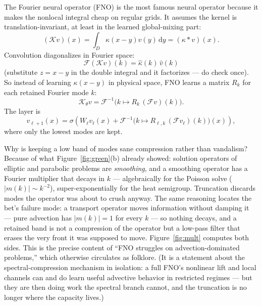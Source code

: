 \documentclass[10pt,a4paper]{article}
\newcommand{\dd}{\mathrm{d}}
\newcommand{\K}{\mathcal{K}}
\newcommand{\F}{\mathcal{F}}
\begin{document}
The Fourier neural operator (FNO) is the most famous neural operator because
it makes the nonlocal integral cheap on regular grids. It assumes the kernel
is translation-invariant, at least in the learned global-mixing part:
\[
  (\K v)(x) = \int_D \kappa(x-y)v(y)\,\dd y = (\kappa * v)(x).
\]
Convolution diagonalizes in Fourier space:
\begin{equation}
  \F(\K v)(k) = \widehat{\kappa}(k)\,\widehat{v}(k)
\label{eq:conv-diagonal}
\end{equation}
(substitute $z = x - y$ in the double integral and it factorizes --- do
check once). So instead of learning $\kappa(x-y)$ in physical space, FNO
learns a matrix $R_k$ for each retained Fourier mode $k$:
\begin{equation}
  \K_\theta v
  = \F^{-1}\!\big( k \mapsto R_k\,(\F v)(k) \big).
\label{eq:fno-kernel}
\end{equation}
The layer is
\begin{equation}
  v_{\ell+1}(x)
  =
  \sigma\!\left(
    W_\ell v_\ell(x)
    + \F^{-1}\!\big( k \mapsto R_{\ell,k}\,(\F v_\ell)(k) \big)(x)
  \right),
\label{eq:fno-layer}
\end{equation}
where only the lowest modes are kept.

Why is keeping a low band of modes sane compression rather than vandalism?
Because of what Figure~\ref{fig:green}(b) already showed: solution
operators of elliptic and parabolic problems are \emph{smoothing}, and a
smoothing operator has a Fourier multiplier that decays in $k$ ---
algebraically for the Poisson solve ($|m(k)| \sim k^{-2}$),
super-exponentially for the heat semigroup. Truncation discards modes the
operator was about to crush anyway. The same reasoning locates the bet's
failure mode: a transport operator moves information without damping it
--- pure advection has $|m(k)| = 1$ for every $k$ --- so nothing decays,
and a retained band is not a compression of the operator but a low-pass
filter that erases the very front it was supposed to move.
Figure~\ref{fig:mult} computes both sides. This is the precise content of
``FNO struggles on advection-dominated problems,'' which otherwise
circulates as folklore. (It is a statement about the spectral-compression
mechanism in isolation: a full FNO's nonlinear lift and local channels can
and do learn useful advective behavior in restricted regimes --- but they
are then doing work the spectral branch cannot, and the truncation is no
longer where the capacity lives.)
\end{document}
